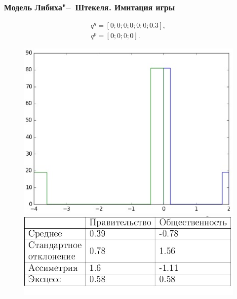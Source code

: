 \documentclass {beamer}
\begin{document}
\begin{frame}
\frametitle{Модель Либиха"--~Штекеля. Имитация игры}
 \begin{gather*}
 q^g = \left[ 0; 0; 0; 0; 0; 0; 0.3 \right], \\
 q^p = \left[ 0; 0; 0; 0 \right].
 \end{gather*}
 
\begin{figure}
	\begin{minipage}[b]{0.45\textwidth}
		
		\includegraphics[width=\textwidth]{forth}
	\end{minipage}
	\begin{minipage}[b]{0.45\textwidth}
		
		\includegraphics[width=\textwidth]{fifth}
	\end{minipage}
	
\end{figure}
	
\end{frame}
\end{document}

